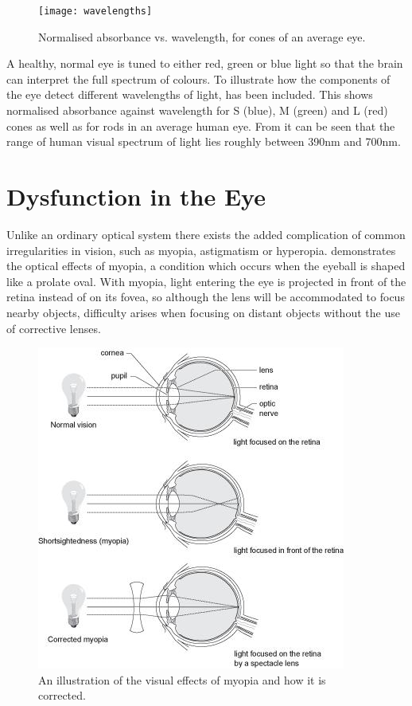  \begin{figure}[H]
\centering
  \texttt{[image: wavelengths]}
\caption{Normalised absorbance vs. wavelength, for cones of an average eye.\cite{wikicones}}
\label{fig:wavelengths}
\end{figure}

A healthy, normal eye is tuned to either red, green or blue light so that the
brain can interpret the full spectrum of colours. To illustrate how the
components of the eye detect different wavelengths of light,
 has been included. This shows normalised absorbance
against wavelength for S (blue), M (green) and L (red) cones as well as for
rods in an average human eye.  From  it can be seen
that the range of human visual spectrum of light lies roughly between 390nm
and 700nm.\cite{starr2010biology}

\section{Dysfunction in the Eye}

Unlike an ordinary optical system there exists the added complication
of common irregularities in vision, such as myopia, astigmatism
or hyperopia.  demonstrates the optical effects of myopia,
a condition which occurs when the eyeball is shaped like a prolate oval.
\cite{saine2002ophthalmic} With myopia, light entering the eye is projected
in front of the retina instead of on its fovea, so although the lens will be
accommodated to focus nearby objects, difficulty arises when focusing on 
distant objects without the use of corrective lenses.

\begin{figure}[H]
\centering
\includegraphics{figures/myopia}
\caption{An illustration of the visual effects of myopia and how it is corrected.\cite{yannuzzi2011retinal}}
\label{fig:myop}
\end{figure}

